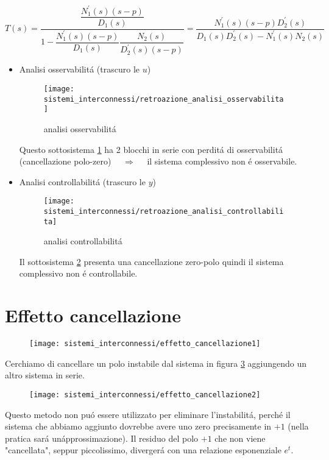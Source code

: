 \documentclass[../main.tex]{subfiles}
\begin{document}
		\[
			T(s) = \dfrac{\dfrac{N_1^{'}(s) (s-p)}{D_1(s)}}{1-\dfrac{N_1^{'}(s) (s-p)}{D_1(s)}\dfrac{N_2(s)}{D_2^{'}(s)(s-p)}} = \dfrac{N_1^{'}(s) (s-p) D_2^{'}(s)}{D_1(s)D_2^{'}(s) - N_1^{'}(s)N_2(s)}
		\]
		\begin{itemize}
			\item 
				Analisi osservabilit\'a (trascuro le $ u $)
				\begin{figure}[H]
					\centering\texttt{[image: sistemi\_interconnessi/retroazione\_analisi\_osservabilita]}
					\caption{analisi osservabilit\'a}
					\label{fig:retroazione_analisi_osservabilita}
				\end{figure}
			
				Questo sottosistema \ref{fig:retroazione_analisi_osservabilita} ha 2 blocchi in serie con perdit\'a di osservabilit\'a (cancellazione polo-zero) $ \quad\Rightarrow\quad $ il sistema complessivo non \'e osservabile.
			\item 
				Analisi controllabilit\'a (trascuro le $ y $)
				\begin{figure}[H]
					\centering\texttt{[image: sistemi\_interconnessi/retroazione\_analisi\_controllabilita]}
					\caption{analisi controllabilit\'a}
					\label{fig:retroazione_analisi_controllabilita}
				\end{figure}
				
				Il sottosistema \ref{fig:retroazione_analisi_controllabilita} presenta una cancellazione zero-polo quindi il sistema complessivo non \'e controllabile.
		\end{itemize}
	
	\section{Effetto cancellazione}
		\begin{figure}[H]
			\centering\texttt{[image: sistemi\_interconnessi/effetto\_cancellazione1]}
			\label{fig:effetto_cancellazione1}
		\end{figure}
	
		Cerchiamo di cancellare un polo instabile dal sistema in figura \ref{fig:effetto_cancellazione1} aggiungendo un altro sistema in serie.
		\begin{figure}[H]
			\centering\texttt{[image: sistemi\_interconnessi/effetto\_cancellazione2]}
			\label{fig:effetto_cancellazione2}
		\end{figure}
	
		Questo metodo non pu\'o essere utilizzato per eliminare l'instabilit\'a, perch\'e il sistema che abbiamo aggiunto dovrebbe avere uno zero precisamente in $ +1 $ (nella pratica sar\'a un\'approssimazione). Il residuo del polo $ +1 $ che non viene "cancellata", seppur piccolissimo, diverger\'a con una relazione esponenziale $ e^t $.
		
\end{document}
